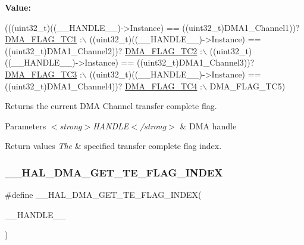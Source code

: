 {\bfseries Value\+:}
\begin{DoxyCode}
(((uint32\_t)((\_\_HANDLE\_\_)->Instance) == ((uint32\_t)DMA1\_Channel1))? \hyperlink{group___d_m_a__flag__definitions_ga02b6c752c28b35dba79fa1d2bb55ec06}{DMA\_FLAG\_TC1} :\(\backslash\)
 ((uint32\_t)((\_\_HANDLE\_\_)->Instance) == ((uint32\_t)DMA1\_Channel2))? \hyperlink{group___d_m_a__flag__definitions_gacdf2954f3faf8314811ed39272825ab0}{DMA\_FLAG\_TC2} :\(\backslash\)
 ((uint32\_t)((\_\_HANDLE\_\_)->Instance) == ((uint32\_t)DMA1\_Channel3))? \hyperlink{group___d_m_a__flag__definitions_ga17463fb2609ad37aebe6955a044e83c7}{DMA\_FLAG\_TC3} :\(\backslash\)
 ((uint32\_t)((\_\_HANDLE\_\_)->Instance) == ((uint32\_t)DMA1\_Channel4))? \hyperlink{group___d_m_a__flag__definitions_gafb3f8a8c7048d344865c47e72a598074}{DMA\_FLAG\_TC4} :\(\backslash\)
   DMA\_FLAG\_TC5)
\end{DoxyCode}


Returns the current D\+MA Channel transfer complete flag. 


\begin{DoxyParams}{Parameters}
{\em $<$strong$>$\+H\+A\+N\+D\+L\+E$<$/strong$>$} & D\+MA handle \\
\hline
\end{DoxyParams}

\begin{DoxyRetVals}{Return values}
{\em The} & specified transfer complete flag index. \\
\hline
\end{DoxyRetVals}
\mbox{\label{group___d_m_a_ex___exported___macros_ga5e765bb3b1c5fc9f1b1abbbb764250bc}} 
\subsubsection{\texorpdfstring{\+\_\+\+\_\+\+H\+A\+L\+\_\+\+D\+M\+A\+\_\+\+G\+E\+T\+\_\+\+T\+E\+\_\+\+F\+L\+A\+G\+\_\+\+I\+N\+D\+EX}{\_\_HAL\_DMA\_GET\_TE\_FLAG\_INDEX}}
{\footnotesize\ttfamily \#define \+\_\+\+\_\+\+H\+A\+L\+\_\+\+D\+M\+A\+\_\+\+G\+E\+T\+\_\+\+T\+E\+\_\+\+F\+L\+A\+G\+\_\+\+I\+N\+D\+EX(\begin{DoxyParamCaption}\item[{}]{\+\_\+\+\_\+\+H\+A\+N\+D\+L\+E\+\_\+\+\_\+ }\end{DoxyParamCaption})}

